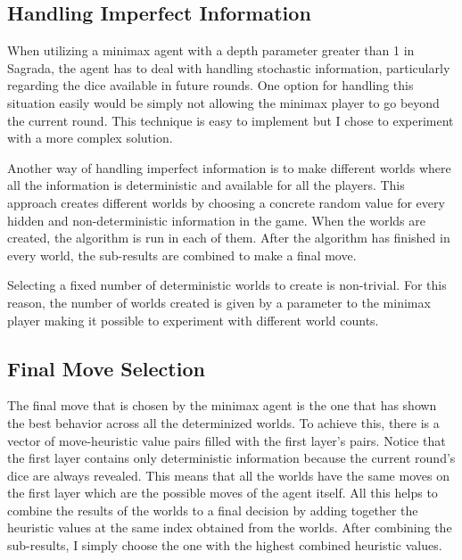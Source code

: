 \subsection{Handling Imperfect Information} \label{sec:Minimax_Handling_Imperfect_Information}

When utilizing a minimax agent with a depth parameter greater than 1 in Sagrada, the agent has to deal with handling stochastic information, particularly 
regarding the dice available in future rounds.  One option for handling this situation easily would be simply not allowing the minimax player to go beyond the current round. 
This technique is easy to implement but I chose to experiment with a more complex solution. 

Another way of handling imperfect information is to make different worlds where all the information is deterministic and available for all the players. This approach
creates different worlds by choosing a concrete random value for every hidden and non-deterministic information in the game. When the worlds are created, the algorithm 
is run in each of them. After the algorithm has finished in every world, the sub-results are combined to make a final move. 

Selecting a fixed number of deterministic worlds to create is non-trivial. For this reason, the number of worlds created is given by a parameter to the minimax player
making it possible to experiment with different world counts. 

\subsection{Final Move Selection} \label{subsec:Minimax_Final_Move_Selection}

The final move that is chosen by the minimax agent is the one that has shown the best behavior across all the determinized worlds. To achieve this,
there is a vector of move-heuristic value pairs filled with the first layer's pairs. Notice that the first layer contains only deterministic
information because the current round's dice are always revealed. This means that all the worlds have the same moves on the first layer which are 
the possible moves of the agent itself. All this helps to combine the results of the worlds to a final decision by adding together the heuristic values
at the same index obtained from the worlds. After combining the sub-results, I simply choose the one with the highest combined heuristic values.

